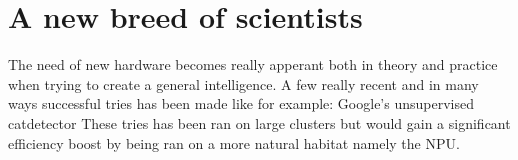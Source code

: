 \documentclass{article}
\begin{document}
\section{A new breed of scientists}
    The need of new hardware becomes really apperant both in
    theory and practice when trying to create a general intelligence.
    A few really recent and in many ways successful tries has been made
    like for example: Google's unsupervised catdetector %
    These tries has been ran on large clusters but would gain a
    significant efficiency boost by being ran on a more natural habitat namely 
    the NPU. 


    
    
\end{document}
